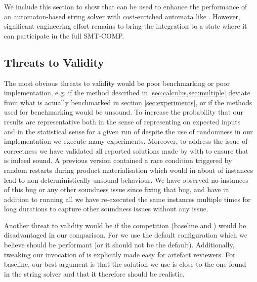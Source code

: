 We include this section to show that \Calculus{} can be used to enhance the
performance of an automaton-based string solver with cost-enriched automata like
\Ostrich{}. However, significant engineering effort remains to bring the
integration to a state where it can participate in the full SMT-COMP.


\subsection{Threats to Validity}

The most obvious threats to validity would be poor benchmarking or poor
implementation, e.g. if the method described in \cref{sec:calculus,sec:multiple}
deviate from what is actually benchmarked in section \cref{sec:experiments}, or
if the methods used for benchmarking would be unsound. To increase the
probability that our results are representative both in the sense of
representing  on expected inputs and in the statistical sense for a given run of
\Catra{} despite the use of randomness in our implementation we execute many
experiments. Moreover, to address the issue of correctness we have validated all
reported solutions made by \Calculus{} with \Nuxmv{} to ensure that \Calculus{}
is indeed sound. A previous version contained a race condition triggered by
random restarts during product materialisation which would in about
 of instances lead to non-deterministically unsound behaviour. We
have observed no instances of this bug or any other soundness issue since fixing
that bug, and have in addition to running all \NrBenchmarks{} we have
re-executed the same instances multiple times for long durations to capture
other soundness issues without any issue.

Another threat to validity would be if the competition (baseline and \Nuxmv)
would be disadvantaged in our comparison. For \Nuxmv{} we use the default
configuration which we believe should be performant (or it should not be the
default). Additionally, tweaking our invocation of \Nuxmv{} is explicitly made
easy for artefact reviewers. For baseline, our best argument is that the
solution we use is close to the one found in the \Ostrich{} string solver and
that it therefore should be realistic.

